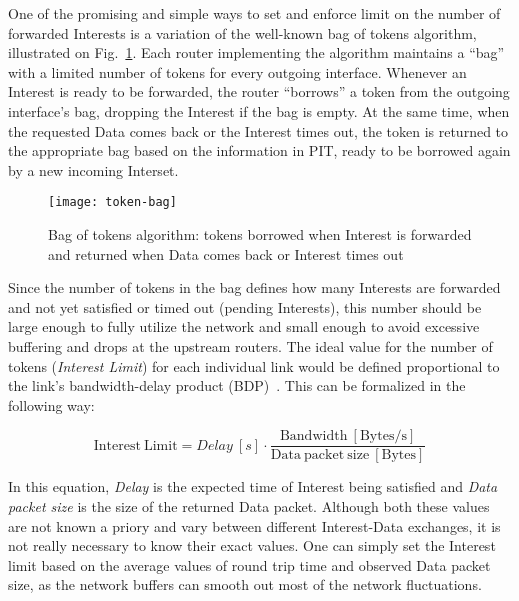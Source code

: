 
One of the promising and simple ways to set and enforce limit on the number of forwarded Interests is a variation of the well-known bag of tokens algorithm, illustrated on Fig.~\ref{fig:bag of tokens}.
Each router implementing the algorithm maintains a ``bag'' with a limited number of tokens for every outgoing interface.
Whenever an Interest is ready to be forwarded, the router ``borrows'' a token from the outgoing interface's bag, dropping the Interest if the bag is empty.
At the same time, when the requested Data comes back or the Interest times out, the token is returned to the appropriate bag based on the information in PIT, ready to be borrowed again by a new incoming Interset.

\begin{figure}[htbp]
  \centering
  \texttt{[image: token-bag]}
  \caption{Bag of tokens algorithm: tokens borrowed when Interest is forwarded and returned when Data comes back or Interest times out}
  \label{fig:bag of tokens}
\end{figure}

Since the number of tokens in the bag defines how many Interests are forwarded and not yet satisfied or timed out (pending Interests), this number should be large enough to fully utilize the network and small enough to avoid excessive buffering and drops at the upstream routers.
The ideal value for the number of tokens (\emph{Interest Limit}) for each individual link would be defined proportional to the link's bandwidth-delay product (BDP)~\cite{tcp-survey}.
This can be formalized in the following way:

\begin{equation}
\mathrm{Interest\ Limit} = Delay\ [s] \cdot \frac{\mathrm{Bandwidth\ [Bytes/s]}}{\mathrm{Data\ packet\ size\ [Bytes]}}
\end{equation}

In this equation, \emph{Delay} is the expected time of Interest being satisfied and \emph{Data packet size} is the size of the returned Data packet.
Although both these values are not known a priory and vary between different Interest-Data exchanges, it is not really necessary to know their exact values.
One can simply set the Interest limit based on the average values of round trip time and observed Data packet size, as the network buffers can smooth out most of the network fluctuations.

